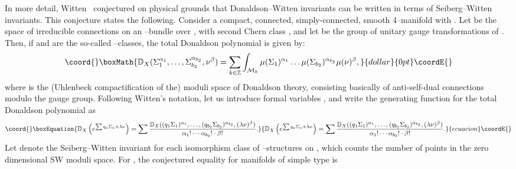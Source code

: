 \documentclass[a4paper,12pt,reqno,sumlimits]{amsart}
\theoremstyle{plain}
\theoremstyle{definition}
\providecommand{\D}{{\mathbb D}}
\providecommand{\Z}{{\mathbb Z}}
\providecommand{\1}{{\bf 1}}
\providecommand{\calA}{{\mathcal A}}
\providecommand{\calG}{{\mathcal G}}
\providecommand{\calM}{{\mathcal M}}
\providecommand{\spinc}{\myHighlight{$\text{spin}^c$}\coordHE{}}
\numberwithin{equation}{section}
\begin{document}
In more detail, Witten~\cite{ewmono} conjectured on physical grounds that
Donaldson--Witten invariants can be written in terms of Seiberg--Witten
invariants. This conjecture states the following.  Consider a compact,
connected, simply-connected, smooth 4--manifold \coordHE{} with \coordHE{}.  Let
\myHighlight{$\calA^*_E$}\coordHE{} be the space of irreducible connections on an \coordHE{}--bundle \coordHE{}
over \coordHE{}, with second Chern class \coordHE{}, and let \myHighlight{$\calG_E$}\coordHE{} be the group
of unitary gauge transformations of \coordHE{}. Then, if \myHighlight{$\mu(\Sigma)\in
H^2(\calA^*_E/\calG_E)$}\coordHE{} and \myHighlight{$\mu(\nu)\in H^4(\calA^*_E/\calG_E)$}\coordHE{} are the
so-called \myHighlight{$\mu$}\coordHE{}--classes, the total Donaldson polynomial is given by:
$$\coord{}\boxMath{
\D_X(\Sigma_1^{\alpha_1},\dots,\Sigma_{b_2}^{\alpha_{b_2}},\nu^\beta)
=\sum_{k\in\Z}\int_{\calM_k}\mu(\Sigma_1)^{\alpha_1}\dots
\mu(\Sigma_{b_2})^{\alpha_{b_2}}\mu(\nu)^\beta,
}{dollar}{0pt}\coordE{}$$
where \myHighlight{$\calM_k$}\coordHE{} is the (Uhlenbeck compactification of the) moduli space of
Donaldson theory, consisting basically of anti-self-dual connections modulo
the gauge group.  Following Witten's notation, let us introduce formal
variables \coordHE{}, and write the generating function for
the total Donaldson polynomial as
\begin{equation*}\coord{}\boxEquation{
  \D_X\left(e^{\sum q_a\Sigma_a+\lambda\nu}\right)=
  \sum \frac{\D_X((q_1\Sigma_1)^{\alpha_1},\dots,(q_{b_2}
    \Sigma_{b_2})^{\alpha_{b_2}},(\lambda\nu)^\beta)}{\alpha_1!\cdots
    \alpha_{b_2}!\cdot\beta!}.
}{
  \D_X\left(e^{\sum q_a\Sigma_a+\lambda\nu}\right)=
  \sum \frac{\D_X((q_1\Sigma_1)^{\alpha_1},\dots,(q_{b_2}
    \Sigma_{b_2})^{\alpha_{b_2}},(\lambda\nu)^\beta)}{\alpha_1!\cdots
    \alpha_{b_2}!\cdot\beta!}.
}{ecuacion}\coordE{}\end{equation*}
Let \coordHE{} denote the Seiberg--Witten invariant for each isomorphism class
\coordHE{} of \spinc--structures on \coordHE{}, which counts the number of points in the
zero dimensional SW moduli space.  For \coordHE{}, the
conjectured equality for manifolds of simple type is~\cite{ewmono}
\end{document}
